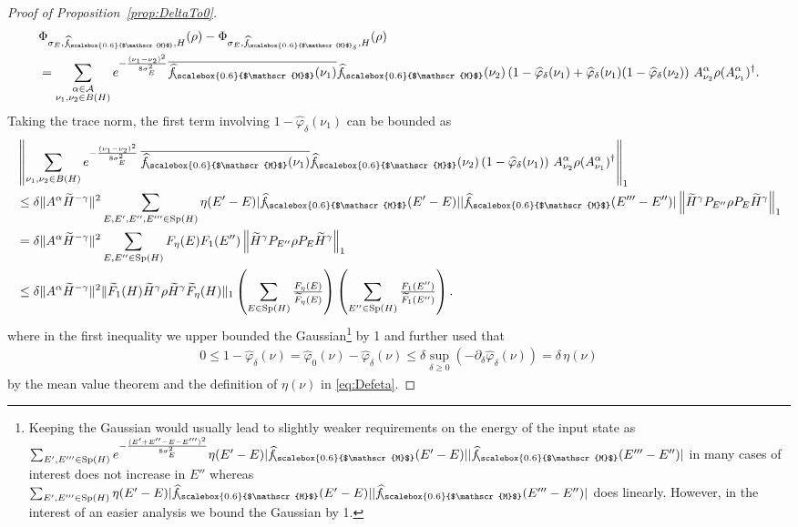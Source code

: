 \documentclass[11pt]{amsart}
\newcommand{\nn}{\nonumber}
\newcommand{\1}{\mathbbm{1}}
\newcommand{\spec}{\operatorname{Sp}}
\renewcommand{\phi}{\varphi}
\newcommand{\cA}{\mathcal{A}}
\newcommand{\hatfM}{\widehat{f}_{\!\scalebox{0.6}{$\mathscr{M}$}}
}
\newcommand{\hatfMdelta}{\widehat{f}_{\!\scalebox{0.6}{$\mathscr{M}$}_\delta}}
\theoremstyle{plain}
\theoremstyle{definition}
\theoremstyle{remark}
\numberwithin{equation}{section}
\begin{document}
\begin{proof}[Proof of Proposition~\ref{prop:DeltaTo0}]
\begin{align}
\label{eq:DifferencePhiDelta0}
    \nn&\Phi_{\sigma_E,\hatfM,H}(\rho) - \Phi_{\sigma_E,\hatfMdelta,H}(\rho)\\&=\sum_{\substack{\alpha\in\cA\\\nu_1,\nu_2\in B(H)}}e^{-\frac{(\nu_1-\nu_2)^2}{8\sigma_E^2}}\overline{\hatfM(\nu_1)}\hatfM(\nu_2)\left(1-\widehat\phi_\delta(\nu_1) +\widehat\phi_\delta(\nu_1)(1-\widehat\phi_\delta(\nu_2)\right)\,A^\alpha_{\nu_2} \rho (A^\alpha_{\nu_1})^\dagger.
\end{align}
Taking the trace norm, the first term involving $1-\widehat\phi_\delta(\nu_1)$  can be bounded as
\begin{align*}
&\left\|\sum_{\substack{\nu_1,\nu_2\in B(H)}}e^{-\frac{(\nu_1-\nu_2)^2}{8\sigma_E^2}}\,\overline{\hatfM(\nu_1)}\hatfM(\nu_2)\left(1-\widehat\phi_\delta(\nu_1)\right)\,A^\alpha_{\nu_2} \rho (A^\alpha_{\nu_1})^\dagger\right\|_1 \\&\le \delta \|A^{\alpha} \widetilde H^{-\gamma}\|^2 \sum_{E,E',E'',E'''\in\spec(H)}  \eta(E'-E)|\hatfM(E'-E)||\hatfM(E'''-E'')| \left\|\widetilde H^{\gamma} P_{E''}\rho P_{E}\widetilde H^{\gamma}\right\|_1
\\&= \delta \|A^{\alpha} \widetilde H^{-\gamma}\|^2 \sum_{E,E''\in\spec(H)}  F_\eta(E) F_1(E'')\left\|\widetilde H^{\gamma} P_{E''}\rho P_{E}\widetilde H^{\gamma}\right\|_1 \\&\le 
\delta\|A^\alpha \widetilde H^{-\gamma}\|^2 \| \widetilde F_1(H)\widetilde H^{\gamma} \rho \widetilde H^{\gamma}\widetilde F_\eta(H)\|_1 \left(\sum_{E\in\spec(H)} \tfrac{F_\eta(E)}{ \widetilde F_\eta(E)}\right)\left( \sum_{E''\in\spec(H)} \tfrac{F_1(E'')}{ \widetilde F_1(E'')}\right).
\end{align*}
where in the first inequality we upper bounded the Gaussian\footnote{Keeping the Gaussian would usually lead to slightly weaker requirements on the energy of the input state as $\sum_{E',E'''\in\spec(H)} e^{-\frac{(E'+E''- E -E''')^2}{8\sigma^2_E}} \eta(E'-E)|\hatfM(E'-E)||\hatfM(E'''-E'')|$ in many cases of interest does not increase in $E''$ whereas $\sum_{E',E'''\in\spec(H)} \eta(E'-E)|\hatfM(E'-E)||\hatfM(E'''-E'')|$ does linearly. However, in the interest of an easier analysis we bound the Gaussian by 1.} by 1 and further used that
\begin{align*}
    0\le1-\widehat\phi_\delta(\nu) = \widehat\phi_0(\nu)-\widehat\phi_\delta(\nu)\le \delta\sup_{\delta\ge 0}(-\partial_\delta\widehat\phi_\delta(\nu))=  \delta\,\eta(\nu)
\end{align*} by the mean value theorem and the definition of $\eta(\nu)$ in \eqref{eq:Defeta}. 

\end{proof}
\end{document}
